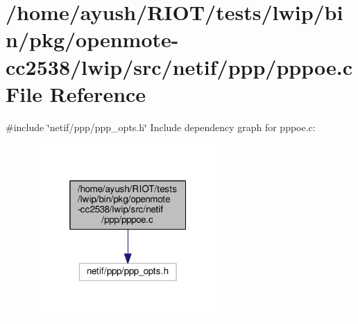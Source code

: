\hypertarget{openmote-cc2538_2lwip_2src_2netif_2ppp_2pppoe_8c}{}\section{/home/ayush/\+R\+I\+O\+T/tests/lwip/bin/pkg/openmote-\/cc2538/lwip/src/netif/ppp/pppoe.c File Reference}
\label{openmote-cc2538_2lwip_2src_2netif_2ppp_2pppoe_8c}
{\ttfamily \#include \char`\"{}netif/ppp/ppp\+\_\+opts.\+h\char`\"{}}\newline
Include dependency graph for pppoe.\+c\+:
\nopagebreak
\begin{figure}[H]
\begin{center}
\leavevmode
\includegraphics[width=205pt]{openmote-cc2538_2lwip_2src_2netif_2ppp_2pppoe_8c__incl}
\end{center}
\end{figure}
